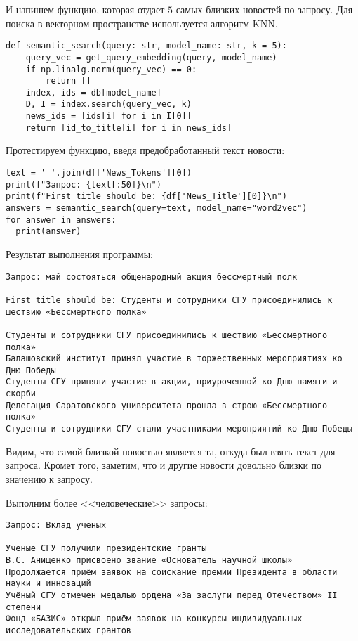 \documentclass[coursework]{SCWorks}
\begin{document}
И напишем функцию, которая отдает $5$ самых близких новостей по запросу. Для поиска в векторном пространстве используется алгоритм KNN.
\begin{verbatim}
def semantic_search(query: str, model_name: str, k = 5):
    query_vec = get_query_embedding(query, model_name)
    if np.linalg.norm(query_vec) == 0:
        return []
    index, ids = db[model_name]
    D, I = index.search(query_vec, k)
    news_ids = [ids[i] for i in I[0]]
    return [id_to_title[i] for i in news_ids]
\end{verbatim}

Протестируем функцию, введя предобработанный текст новости:
\begin{verbatim}
text = ' '.join(df['News_Tokens'][0])
print(f"Запрос: {text[:50]}\n")
print(f"First title should be: {df['News_Title'][0]}\n")
answers = semantic_search(query=text, model_name="word2vec")
for answer in answers:
  print(answer)
\end{verbatim}

Результат выполнения программы:
\begin{verbatim}
Запрос: май состояться общенародный акция бессмертный полк

First title should be: Студенты и сотрудники СГУ присоединились к шествию «Бессмертного полка»

Студенты и сотрудники СГУ присоединились к шествию «Бессмертного полка»
Балашовский институт принял участие в торжественных мероприятиях ко Дню Победы
Студенты СГУ приняли участие в акции, приуроченной ко Дню памяти и скорби
Делегация Саратовского университета прошла в строю «Бессмертного полка»
Студенты и сотрудники СГУ стали участниками мероприятий ко Дню Победы
\end{verbatim}

Видим, что самой близкой новостью является та, откуда был взять текст для запроса. Кромет того, заметим, что и другие новости довольно близки по значению к запросу.

Выполним более <<человеческие>> запросы:
\begin{verbatim}
Запрос: Вклад ученых

Ученые СГУ получили президентские гранты
В.С. Анищенко присвоено звание «Основатель научной школы»
Продолжается приём заявок на соискание премии Президента в области науки и инноваций
Учёный СГУ отмечен медалью ордена «За заслуги перед Отечеством» II степени
Фонд «БАЗИС» открыл приём заявок на конкурсы индивидуальных исследовательских грантов
\end{verbatim}
\end{document}
